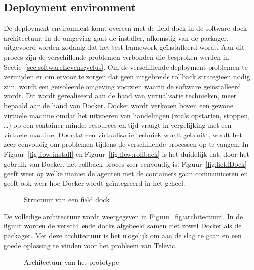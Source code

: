 \subsection{Deployment environment}
De deployment environment komt overeen met de field dock in de software dock architectuur.
In de omgeving gaat de installer, afkomstig van de packager, uitgevoerd worden zodanig dat het test framework geïnstalleerd wordt.
Aan dit proces zijn de verschillende problemen verbonden die besproken werden in Sectie~\vref{sec:softwareLevenscyclus}.
Om de verschillende deployment problemen te vermijden en om ervoor te zorgen dat geen uitgebreide rollback strategieën nodig zijn, wordt een geïsoleerde omgeving voorzien waarin de software geïnstalleerd wordt. 
Dit wordt gerealiseerd aan de hand van virtualisatie technieken, meer bepaald aan de hand van Docker.
Docker wordt verkozen boven een gewone virtuele machine omdat het uitvoeren van handelingen (zoals opstarten, stoppen, \ldots) op een container minder resources en tijd vraagt in vergelijking met een virtuele machine.
Doordat een virtualisatie techniek wordt gebruikt, wordt het zeer eenvoudig om problemen tijdens de verschillende processen op te vangen.
In Figuur~\vref{fig:flow:install} en Figuur~\vref{fig:flow:rollback} is het duidelijk dat, door het gebruik van Docker, het rollback proces zeer eenvoudig is.
Figuur~\vref{fig:fieldDock} geeft weer op welke manier de agenten met de containers gaan communiceren en geeft ook weer hoe Docker wordt geïntegreerd in het geheel.

\begin{figure}[!ht]
\centering
{}
\caption{Structuur van een field dock}
\label{fig:fieldDock}
\end{figure}

De volledige architectuur wordt weergegeven in Figuur~\vref{fig:architectuur}.
In de figuur worden de verschillende docks afgebeeld samen met zowel Docker als de packager.
Met deze architectuur is het mogelijk om aan de slag te gaan en een goede oplossing te vinden voor het probleem van Televic.

\begin{figure}[!ht]
\centering
{}
\caption{Architectuur van het prototype}
\label{fig:architectuur}
\end{figure}
